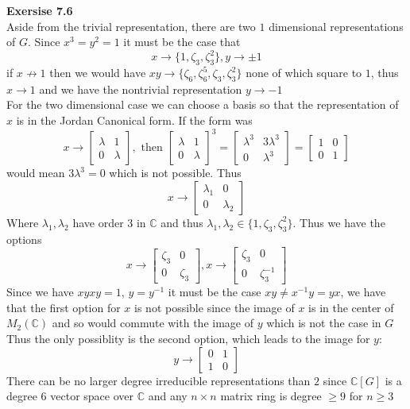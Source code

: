 \documentclass[12pt]{article}
\newenvironment{ques}[1]{\textbf{Exersise #1}\vspace{1 mm}\\ }{\bigskip}
\theoremstyle{definition}
\newcommand{\C}{\mathbb C}
\begin{document}
\begin{ques}{7.6}
	Aside from the trivial representation, there are two $1$ dimensional
	representations of $G$. Since $x^3 = y^2 = 1$ it must be the case that
	$$x \to \{1, \zeta_3, \zeta_3^2 \}, y \to \pm 1$$
	if $x \not \to 1$ then we would have $xy \to \{\zeta_6, \zeta_6^5,
	\zeta_3, \zeta_3^2 \}$ none of which square to $1$, thus $x \to 1$ and we
	have the nontrivial representation $y \to -1$\\
	For the two dimensional case we can choose a basis so that the
	representation of $x$ is in the Jordan Canonical form. If the form was
	$$x \to 
	\begin{bmatrix}
	\lambda & 1\\
	0 & \lambda
	\end{bmatrix}, \text{ then }
	\begin{bmatrix}
	\lambda & 1\\
	0 & \lambda
	\end{bmatrix}^3
	=
	\begin{bmatrix}
	\lambda^3 & 3\lambda^3\\
	0 & \lambda^3
	\end{bmatrix}
	=
	\begin{bmatrix}
	1 & 0\\
	0 & 1
	\end{bmatrix}
	$$
	would mean $3\lambda^3 = 0$ which is not possible. Thus
	$$x \to 
	\begin{bmatrix}
	\lambda_1 & 0\\
	0 & \lambda_2
	\end{bmatrix}
	$$
	Where $\lambda_1,\lambda_2$ have order $3$ in $\C$ and thus
	$\lambda_1,\lambda_2 \in \{1, \zeta_3, \zeta_3^2\}$. Thus we have the options
	$$x \to
	\begin{bmatrix}
	\zeta_3 & 0\\
	0 & \zeta_3
	\end{bmatrix},
	x \to 
	\begin{bmatrix}
	\zeta_3 & 0\\
	0 & \zeta_3^{-1}
	\end{bmatrix}$$
	Since we have $xyxy =
	1$, $y=y^{-1}$ it must be the case $xy \neq x^{-1}y = yx$, we have that the first
	option for $x$ is not possible since the image of $x$ is in the center of
	$M_2(\C)$ and so would commute with the image of $y$ which is not the case in $G$\\
	Thus the only possiblity is the second option, which leads to the image for $y$:
	$$y \to 
	\begin{bmatrix}
	0 & 1\\
	1 & 0
	\end{bmatrix}
	$$
	There can be no larger degree irreducible representations than $2$ since
	$\C[G]$ is a degree $6$ vector space over $\C$ and any $n \times n$ matrix
	ring is degree $\geq 9$ for $n \geq 3$
\end{ques}
\end{document}
